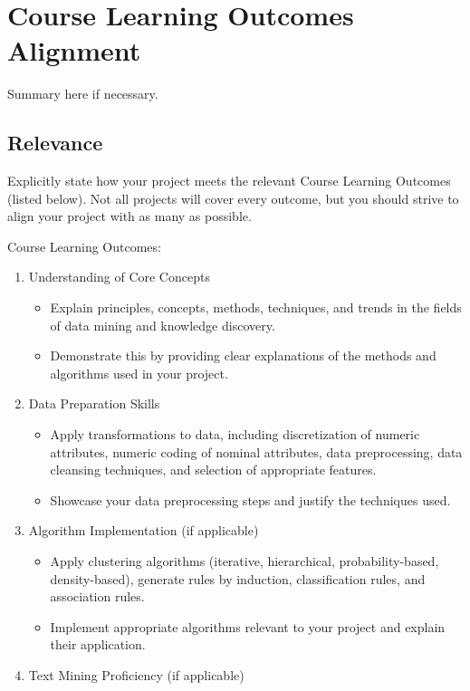 \chapter{Course Learning Outcomes Alignment}
\label{ch:course}

Summary here if necessary.

\section{Relevance}
Explicitly state how your project meets the relevant Course Learning Outcomes (listed below). Not all projects will cover every outcome, but you should strive to align your project with as many as possible.

Course Learning Outcomes:
\begin{enumerate}
  \item Understanding of Core Concepts
  \begin{itemize}
    \item Explain principles, concepts, methods, techniques, and trends in the fields of data mining and knowledge discovery.
    \item Demonstrate this by providing clear explanations of the methods and algorithms used in your project.
  \end{itemize}
  \item Data Preparation Skills
  \begin{itemize}
    \item Apply transformations to data, including discretization of numeric attributes, numeric coding of nominal attributes, data preprocessing, data cleansing techniques, and selection of appropriate features.
    \item Showcase your data preprocessing steps and justify the techniques used.
  \end{itemize}
  \item Algorithm Implementation (if applicable)
  \begin{itemize}
    \item Apply clustering algorithms (iterative, hierarchical, probability-based, density-based), generate rules by induction, classification rules, and association rules.
    \item Implement appropriate algorithms relevant to your project and explain their application.
  \end{itemize}
  \item Text Mining Proficiency (if applicable)

\end{enumerate}
